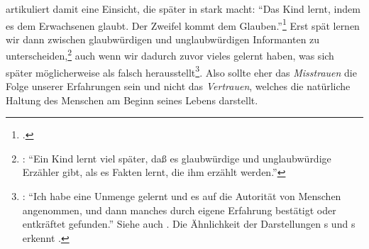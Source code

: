  artikuliert damit eine Einsicht, die später
 in  stark macht:
\enquote{Das Kind lernt, indem es dem Erwachsenen glaubt. Der Zweifel kommt  dem
Glauben.}\footnote{\cite[][\S~160]{Wittgenstein:UeberGewissheit1977}.} Erst spät
lernen wir dann zwischen glaubwürdigen und unglaubwürdigen Informanten zu
unterscheiden,\footnote{\cite[Vgl.][\S~143]{Wittgenstein:UeberGewissheit1977}:
\enquote{Ein Kind lernt viel später, daß es glaubwürdige und unglaubwürdige
Erzähler gibt, als es Fakten lernt, die ihm erzählt werden.}} auch wenn wir
dadurch zuvor vieles gelernt haben, was sich später möglicherweise als falsch
herausstellt\footnote{\cite[Vgl.][\S~161]{Wittgenstein:UeberGewissheit1977}:
\enquote{Ich habe eine Unmenge gelernt und es auf die Autorität von Menschen
angenommen, und dann manches durch eigene Erfahrung bestätigt oder entkräftet
gefunden.} Siehe auch \cite[][\S\S~159,
162, 170]{Wittgenstein:UeberGewissheit1977}. Die Ähnlichkeit der Darstellungen
s und s erkennt
\textcite[][434]{Stevenson:WhyBelieveWhatPeopleSay?1993}.}.
Also sollte eher das \emph{Misstrauen} die Folge unserer Erfahrungen sein und
nicht das \emph{Vertrauen}, welches die natürliche Haltung des
Menschen am Beginn seines Lebens darstellt.


